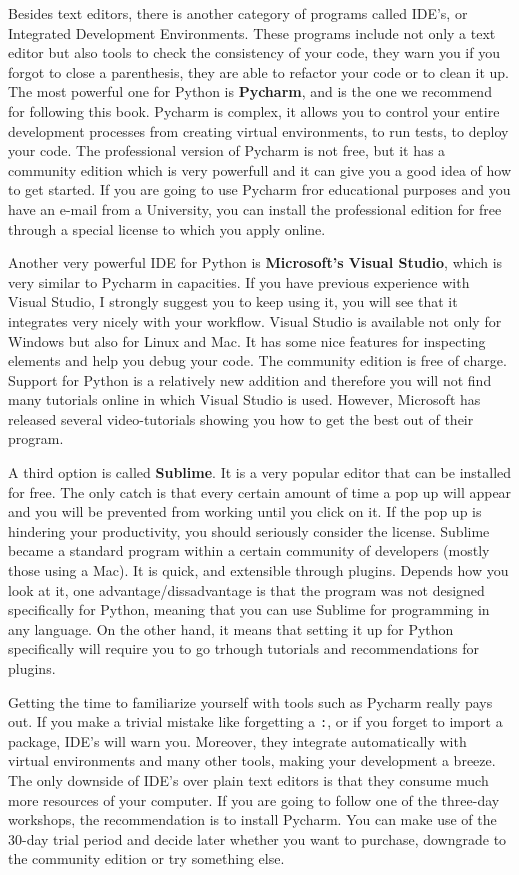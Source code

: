 Besides text editors, there is another category of programs called IDE’s, or Integrated Development Environments. These programs include not only a text editor but also tools to check the consistency of your code, they warn you if you forgot to close a parenthesis, they are able to refactor your code or to clean it up. The most powerful one for Python is \textbf{Pycharm}, and is the one we recommend for following this book. Pycharm is complex, it allows you to control your entire development processes from creating virtual environments, to run tests, to deploy your code. The professional version of Pycharm is not free, but it has a community edition which is very powerfull and it can give you a good idea of how to get started. If you are going to use Pycharm fror educational purposes and you have an e-mail from a University, you can install the professional edition for free through a special license to which you apply online.

Another very powerful IDE for Python is \textbf{Microsoft’s Visual Studio}, which is very similar to Pycharm in capacities. If you have previous experience with Visual Studio, I strongly suggest you to keep using it, you will see that it integrates very nicely with your workflow. Visual Studio is available not only for Windows but also for Linux and Mac. It has some nice features for inspecting elements and help you debug your code. The community edition is free of charge. Support for Python is a relatively new addition and therefore you will not find many tutorials online in which Visual Studio is used. However, Microsoft has released several video-tutorials showing you how to get the best out of their program. 

A third option is called \textbf{Sublime}. It is a very popular editor that can be installed for free. The only catch is that every certain amount of time a pop up will appear and you will be prevented from working until you click on it. If the pop up is hindering your productivity, you should seriously consider the license. Sublime became a standard program within a certain community of developers (mostly those using a Mac). It is quick, and extensible through plugins. Depends how you look at it, one advantage/dissadvantage is that the program was not designed specifically for Python, meaning that you can use Sublime for programming in any language. On the other hand, it means that setting it up for Python specifically will require you to go trhough tutorials and recommendations for plugins. 

Getting the time to familiarize yourself with tools such as Pycharm really pays out. If you make a trivial mistake like forgetting a \texttt{:}, or if you forget to import a package, IDE's will warn you. Moreover, they integrate automatically with virtual environments and many other tools, making your development a breeze. The only downside of IDE’s over plain text editors is that they consume much more resources of your computer. If you are going to follow one of the three-day workshops, the recommendation is to install Pycharm. You can make use of the 30-day trial period and decide later whether you want to purchase, downgrade to the community edition or try something else. 

